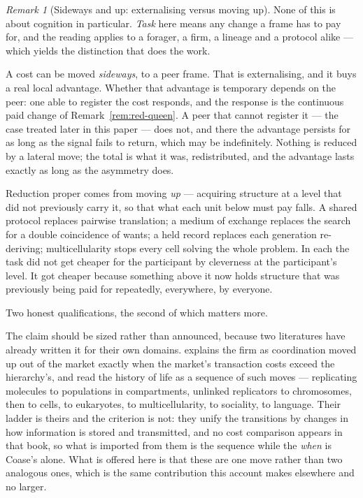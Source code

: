 \documentclass[11pt,a4paper]{article}
\theoremstyle{remark}\newtheorem{remark}[definition]{Remark}
\begin{document}
\begin{remark}[Sideways and up: externalising versus moving up]\label{rem:sideways-and-up}
None of this is about cognition in particular. \emph{Task} here means any change a frame has to pay
for, and the reading applies to a forager, a firm, a lineage and a protocol alike --- which yields the
distinction that does the work.

A cost can be moved \emph{sideways}, to a peer frame. That is externalising, and it buys a real local
advantage. Whether that advantage is temporary depends on the peer: one able to register the cost
responds, and the response is the continuous paid change of Remark~\ref{rem:red-queen}. A peer that
cannot register it --- the case treated later in this paper --- does not, and there the advantage
persists for as long as the signal fails to return, which may be indefinitely. Nothing is reduced by a lateral move; the
total is what it was, redistributed, and the advantage lasts exactly as long as the asymmetry does.

Reduction proper comes from moving \emph{up} --- acquiring structure at a level that did not previously
carry it, so that what each unit below must pay falls. A shared protocol replaces pairwise translation;
a medium of exchange replaces the search for a double coincidence of wants; a held record replaces each
generation re-deriving; multicellularity stops every cell solving the whole problem. In each the task
did not get cheaper for the participant by cleverness at the participant's level. It got cheaper because
something above it now holds structure that was previously being paid for repeatedly, everywhere, by
everyone.

Two honest qualifications, the second of which matters more.

The claim should be sized rather than announced, because two literatures have already written it for
their own domains. \citet{coase1937} explains the firm as coordination moved up out of the market
exactly when the market's transaction costs exceed the hierarchy's, and
\citet{maynardsmith1995} read the history of life as a sequence of such moves --- replicating
molecules to populations in compartments, unlinked replicators to chromosomes, then to cells, to
eukaryotes, to multicellularity, to sociality, to language. Their ladder is theirs and the criterion is
not: they unify the transitions by changes in how information is stored and transmitted, and no
cost comparison appears in that book, so what is imported from them is the sequence while the
\emph{when} is Coase's alone. What is offered here is that these are one
move rather than two analogous ones, which is the same contribution this account
makes elsewhere and no larger.


\end{remark}
\end{document}
